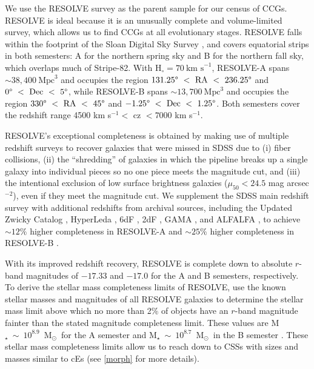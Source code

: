 \documentclass[iop,apj]{emulateapj}
\newcommand{\Msun}{M$_{\odot}$}
\begin{document}
\noindent We use the RESOLVE survey \citep[][Kannappan et al., in prep]{Kannappan2008} as the parent sample for our census of CCGs. RESOLVE is ideal because it is an unusually complete and volume-limited survey, which allows us to find CCGs at all evolutionary stages. RESOLVE falls within the footprint of the Sloan Digital Sky Survey \citep[SDSS,][]{York2000}, and covers equatorial strips in both semesters: A for the northern spring sky and B for the northern fall sky, which overlaps much of Stripe-82. With $\text{H}_{\circ} = 70~\text{km~s}^{-1}$, RESOLVE-A spans $\sim38,400~\text{Mpc}^3$ and occupies the region $131.25\degree~<~\text{RA}~<~236.25\degree$ and $0\degree~<~\text{Dec}~<~5\degree$, while RESOLVE-B spans $\sim13,700~\text{Mpc}^3$ and occupies the region $330\degree~<~\text{RA}~<~45\degree$ and $-1.25\degree~<~\text{Dec}~<~1.25\degree$. Both semesters cover the redshift range 4500 km s$^{-1} <$ cz $< 7000$ km s$^{-1}$.

RESOLVE's exceptional completeness is obtained by making use of multiple redshift surveys to recover galaxies that were missed in SDSS due to (i) fiber collisions, (ii) the ``shredding'' of galaxies in which the pipeline breaks up a single galaxy into individual pieces so no one piece meets the magnitude cut, and (iii) the intentional exclusion of low surface brightness galaxies ($\mu_{50} < 24.5$ mag arcsec$^{-2}$), even if they meet the magnitude cut. We supplement the SDSS main redshift survey with additional redshifts from archival sources, including the Updated Zwicky Catalog \citep{Falco1999}, HyperLeda \citep{Paturel2003}, 6dF \citep{Jones2009}, 2dF \citep{Colless2001}, GAMA \citep{Driver2011}, and ALFALFA \citep{Haynes2011}, to achieve $\sim12\%$ higher completeness in RESOLVE-A and $\sim25\%$ higher completeness in RESOLVE-B \citep{Eckert2015}.

With its improved redshift recovery, RESOLVE is complete down to absolute $r$-band magnitudes of $-17.33$ and $-17.0$ for the A and B semesters, respectively. To derive the stellar mass completeness limits of RESOLVE, \citet{Eckert2016} use the known stellar masses and magnitudes of all RESOLVE galaxies to determine the stellar mass limit above which no more than 2\% of objects have an $r$-band magnitude fainter than the stated magnitude completeness limit. These values are M$_{\star}~\sim~10^{8.9}$~\Msun~for the A semester and M$_{\star}~\sim~10^{8.7}$~\Msun~in the B semester \citep[Figure 8 in ][]{Eckert2016}. These stellar mass completeness limits allow us to reach down to CSSs with sizes and masses similar to cEs (see \autoref{morph} for more details).
\end{document}
